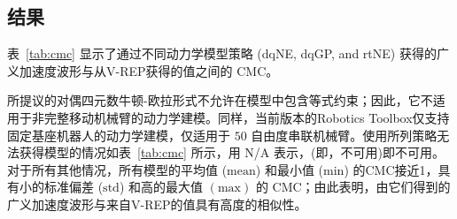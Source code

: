 \subsection{\normalfont\bfseries 结果}

表~\ref{tab:cmc} 显示了通过不同动力学模型策略 (dqNE, dqGP, and rtNE) 获得的广义加速度波形与从V-REP获得的值之间的 CMC。

所提议的对偶四元数牛顿-欧拉形式不允许在模型中包含等式约束；因此，它不适用于非完整移动机械臂的动力学建模。同样，当前版本的Robotics Toolbox仅支持固定基座机器人的动力学建模，仅适用于 $50$ 自由度串联机械臂。使用所列策略无法获得模型的情况如表~\ref{tab:cmc} 所示，用 N/A 表示，(即，不可用)即不可用。对于所有其他情况，所有模型的平均值 ($\mathrm{mean}$) 和最小值 ($\mathrm{min}$) 的CMC接近1，具有小的标准偏差 ($\mathrm{std}$) 和高的最大值 $\left(\mathrm{max}\right)$ 的 CMC；由此表明，由它们得到的广义加速度波形与来自V-REP的值具有高度的相似性。

